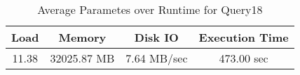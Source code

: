\documentclass[../../main.tex]{subfiles}
\begin{document}
    \begin{table}
        \begin{center}
            \begin{tabular}{ |c|c|c|c| } 
            \hline
            Load & Memory & Disk IO & Execution Time\\
            \hline
            11.38 & 32025.87 MB & 7.64 MB/sec & 473.00 sec \\
            \hline
            \end{tabular}
            \\[1pt]
            \caption{Average Parametes over Runtime for Query18}
        \end{center}
    \end{table}
    \pagebreak
\end{document}
